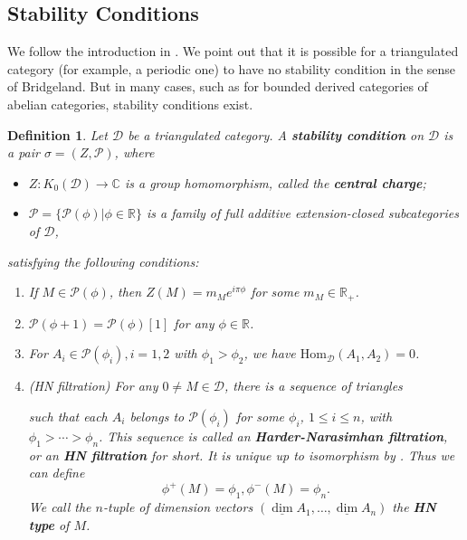 \documentclass[a4paper,12pt]{amsart}
\newtheorem{definition}[theorem]{Definition}
\newcommand{\Hom}{\mathrm{Hom}}
\newcommand{\udv}{\underline{\dim}}
\begin{document}
\subsection{Stability Conditions}
We follow the introduction in \cite{Bri2002}. We point out that it is possible for a triangulated category (for example, a periodic one) to have no stability condition in the sense of Bridgeland. But in many cases, such as for bounded derived categories of abelian categories, stability conditions exist.
\begin{definition}
    Let $\mathcal{D}$ be a triangulated category. A \textbf{stability condition} on $\mathcal{D}$ is a pair $\sigma=(Z,\mathcal{P})$, where
    \begin{itemize}
        \item $Z:K_0(\mathcal{D})\rightarrow\mathbb{C}$ is a group homomorphism, called the \textbf{central charge};
        \item $\mathcal{P}=\{\mathcal{P}(\phi)|\phi\in\mathbb{R}\}$ is a family of full additive extension-closed subcategories of $\mathcal{D}$,
    \end{itemize}
    satisfying the following conditions:
    \begin{enumerate}
        \item If $M\in\mathcal{P}(\phi)$, then $Z(M)=m_Me^{i\pi\phi}$ for some $m_M\in\mathbb{R}_+$.
        \item $\mathcal{P}(\phi+1)=\mathcal{P}(\phi)[1]$ for any $\phi\in\mathbb{R}$.
        \item For $A_i\in\mathcal{P}(\phi_i),i=1,2$ with $\phi_1>\phi_2$, we have $\Hom_\mathcal{D}(A_1,A_2)=0$.
        \item (HN filtration) For any $0\neq M\in\mathcal{D}$, there is a sequence of triangles
        \begin{center}
        \end{center}
        such that each $A_i$ belongs to $\mathcal{P}(\phi_i)$ for some $\phi_i$, $1\leqslant i\leqslant n$, with $\phi_1>\cdots>\phi_n$. This sequence is called an \textbf{Harder-Narasimhan filtration}, or an \textbf{HN filtration} for short. It is unique up to isomorphism by \cite{Bri2002}. Thus we can define
        \[\phi^+(M)=\phi_1,\phi^-(M)=\phi_n.\]
        We call the $n$-tuple of dimension vectors $(\udv A_1,\dots,\udv A_n)$ the \textbf{HN type} of $M$.
    \end{enumerate}
\end{definition}
\end{document}
